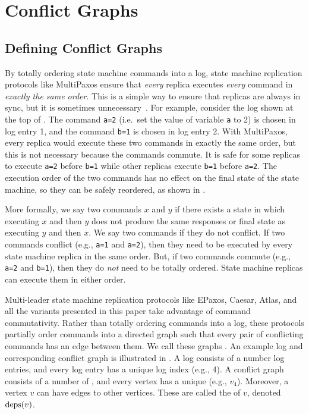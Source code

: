 \section{Conflict Graphs}
\subsection{Defining Conflict Graphs}
By totally ordering state machine commands into a log, state machine
replication protocols like MultiPaxos ensure that \emph{every} replica executes
\emph{every} command in \emph{exactly the same order}. This is a simple way to
ensure that replicas are always in sync, but it is sometimes
unnecessary~\cite{lamport2005generalized}. For example, consider the log shown
at the top of . The command \texttt{a=2} (i.e.\ set the
value of variable \texttt{a} to 2) is chosen in log entry 1, and the command
\texttt{b=1} is chosen in log entry 2. With MultiPaxos, every replica would
execute these two commands in exactly the same order, but this is not necessary
because the commands commute. It is safe for some replicas to execute
\texttt{a=2} before \texttt{b=1} while other replicas execute \texttt{b=1}
before \texttt{a=2}. The execution order of the two commands has no effect on
the final state of the state machine, so they can be safely reordered, as shown
in .

{}

More formally, we say two commands $x$ and $y$  if there
exists a state in which executing $x$ and then $y$ does not produce the same
responses or final state as executing $y$ and then $x$. We say two commands
 if they do not conflict. If two commands conflict (e.g.,
\texttt{a=1} and \texttt{a=2}), then they need to be executed by every state
machine replica in the same order. But, if two commands commute (e.g.,
\texttt{a=2} and \texttt{b=1}), then they do \emph{not} need to be totally
ordered. State machine replicas can execute them in either order.

Multi-leader state machine replication protocols like EPaxos, Caesar, Atlas,
and all the \BPaxos{} variants presented in this paper take advantage of
command commutativity. Rather than totally ordering commands into a log, these
protocols partially order commands into a directed graph such that every pair
of conflicting commands has an edge between them. We call these graphs
. An example log and corresponding conflict graph is
illustrated in . A log consists of a number log entries,
and every log entry has a unique log index (e.g., 4). A conflict graph consists
of a number of , and every vertex has a unique
 (e.g., $v_4$). Moreover, a vertex $v$ can have edges to
other vertices. These are called the  of $v$, denoted
$\text{deps}(v)$.

